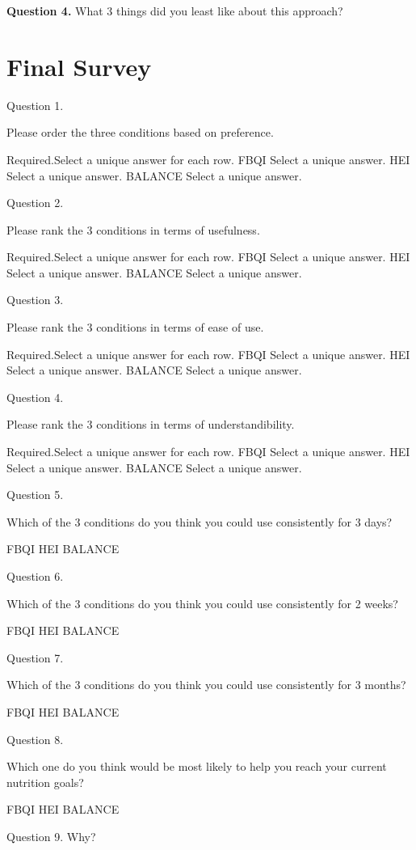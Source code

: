 \noindent\textbf{Question 4.}
What 3 things did you least like about this approach? 
 

\section{Final Survey}
Question 1.

Please order the three conditions based on preference.


Required.Select a unique answer for each row.
FBQI		
 Select a unique answer.
HEI		
 Select a unique answer.
BALANCE		
 Select a unique answer.

Question 2.

Please rank the 3 conditions in terms of usefulness.

Required.Select a unique answer for each row.
FBQI		
 Select a unique answer.
HEI		
 Select a unique answer.
BALANCE		
 Select a unique answer.

Question 3.

Please rank the 3 conditions in terms of ease of use.

Required.Select a unique answer for each row.
FBQI		
 Select a unique answer.
HEI		
 Select a unique answer.
BALANCE		
 Select a unique answer.

Question 4.

Please rank the 3 conditions in terms of understandibility.

Required.Select a unique answer for each row.
FBQI		
 Select a unique answer.
HEI		
 Select a unique answer.
BALANCE		
 Select a unique answer.

Question 5.

Which of the 3 conditions do you think you could use consistently for 3 days?

	FBQI
	HEI
	BALANCE

Question 6.

Which of the 3 conditions do you think you could use consistently for 2 weeks?

	FBQI
	HEI
	BALANCE

Question 7.

Which of the 3 conditions do you think you could use consistently for 3 months?

	FBQI
	HEI
	BALANCE

Question 8.

Which one do you think would be most likely to help you reach your current nutrition goals?

	FBQI
	HEI
	BALANCE

Question 9.
Why? 
